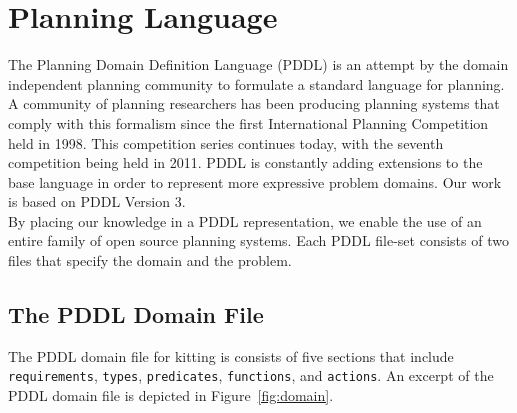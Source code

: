 
\section{Planning Language}\label{S:PDDL}
The Planning Domain Definition Language (PDDL) \cite{PDDL} is an attempt by the domain independent planning community to formulate a standard language for planning. A community of planning researchers has been producing planning systems that comply with this formalism since the first International Planning Competition held in 1998. This competition series
continues today, with the seventh competition being held in 2011. PDDL is constantly adding extensions to the base language in order to represent more expressive problem domains. Our work is based on PDDL Version 3.\\
By placing our knowledge in a PDDL representation, we enable the use of an entire family of open source planning systems.
Each PDDL file-set consists of two files that specify the domain and the problem.

\subsection{The PDDL Domain File}\label{S:PDDL-domain}
The PDDL domain file for kitting is consists of five sections that include \texttt{requirements}, \texttt{types}, \texttt{predicates}, \texttt{functions}, and \texttt{actions}. An excerpt of the PDDL domain file is depicted in Figure~\ref{fig:domain}.

